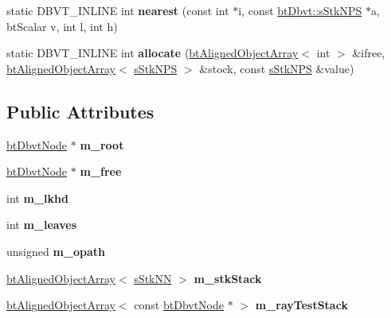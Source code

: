 \begin{DoxyCompactItemize}
static D\+B\+V\+T\+\_\+\+I\+N\+L\+I\+NE int {\bfseries nearest} (const int $\ast$i, const \hyperlink{structbtDbvt_1_1sStkNPS}{bt\+Dbvt\+::s\+Stk\+N\+PS} $\ast$a, bt\+Scalar v, int l, int h)
\item 
\mbox{\label{structbtDbvt_a0f9c3a3fa62050f132de16de2d362fd1}} 
static D\+B\+V\+T\+\_\+\+I\+N\+L\+I\+NE int {\bfseries allocate} (\hyperlink{classbtAlignedObjectArray}{bt\+Aligned\+Object\+Array}$<$ int $>$ \&ifree, \hyperlink{classbtAlignedObjectArray}{bt\+Aligned\+Object\+Array}$<$ \hyperlink{structbtDbvt_1_1sStkNPS}{s\+Stk\+N\+PS} $>$ \&stock, const \hyperlink{structbtDbvt_1_1sStkNPS}{s\+Stk\+N\+PS} \&value)
\end{DoxyCompactItemize}
\subsection*{Public Attributes}
\begin{DoxyCompactItemize}
\item 
\mbox{\label{structbtDbvt_ab94cafa934be10937efb737a19eeec59}} 
\hyperlink{structbtDbvtNode}{bt\+Dbvt\+Node} $\ast$ {\bfseries m\+\_\+root}
\item 
\mbox{\label{structbtDbvt_a02232c5537dc989e50c77a3f3eab3633}} 
\hyperlink{structbtDbvtNode}{bt\+Dbvt\+Node} $\ast$ {\bfseries m\+\_\+free}
\item 
\mbox{\label{structbtDbvt_acd77bda8e22d25d2d251178f6155cde0}} 
int {\bfseries m\+\_\+lkhd}
\item 
\mbox{\label{structbtDbvt_a8fe957e11b755e1bd5f8df46000390b0}} 
int {\bfseries m\+\_\+leaves}
\item 
\mbox{\label{structbtDbvt_a3887b5ca4953188b53f4261dac5c704b}} 
unsigned {\bfseries m\+\_\+opath}
\item 
\mbox{\label{structbtDbvt_a5222bdee7e88c5a3363b5c4a99db6341}} 
\hyperlink{classbtAlignedObjectArray}{bt\+Aligned\+Object\+Array}$<$ \hyperlink{structbtDbvt_1_1sStkNN}{s\+Stk\+NN} $>$ {\bfseries m\+\_\+stk\+Stack}
\item 
\mbox{\label{structbtDbvt_aa02f97bae6a80914665f2bc99305b115}} 
\hyperlink{classbtAlignedObjectArray}{bt\+Aligned\+Object\+Array}$<$ const \hyperlink{structbtDbvtNode}{bt\+Dbvt\+Node} $\ast$ $>$ {\bfseries m\+\_\+ray\+Test\+Stack}
\end{DoxyCompactItemize}


